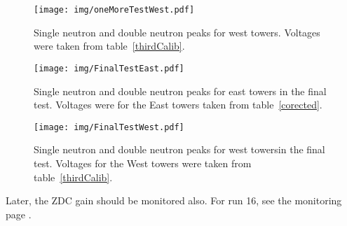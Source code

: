 \begin{figure}[!htb]
\begin{center}
\texttt{[image: img/oneMoreTestWest.pdf]}
\end{center}
\caption{Single neutron and double neutron peaks for west towers. 
Voltages were taken from table~\ref{thirdCalib}.}
\label{oneMoreTestWest}
\end{figure}

\begin{figure}[!htb]
\begin{center}
\texttt{[image: img/FinalTestEast.pdf]}
\end{center}
\caption{Single neutron and double neutron peaks for east towers in the final test. Voltages were
for the East towers taken from table~\ref{corected}.}
\label{finalTestEast}
\end{figure}

\begin{figure}[!htb]
\begin{center}
\texttt{[image: img/FinalTestWest.pdf]}
\end{center}
\caption{Single neutron and double neutron peaks for west towersin the final test. Voltages
for the West towers were taken from table~\ref{thirdCalib}.}
\label{finalTestWest}
\end{figure}

Later, the ZDC gain should be monitored also. For run 16, see the monitoring page \cite{ZDCmonPage}.